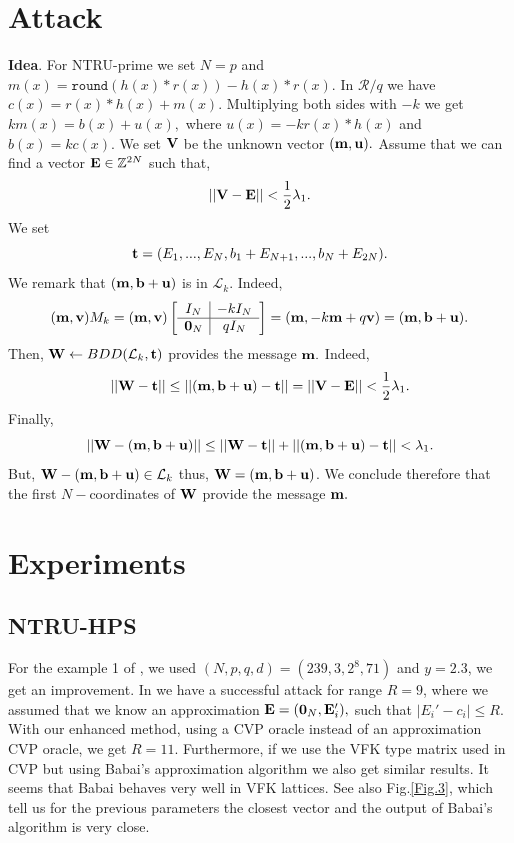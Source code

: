 \documentclass{amsart}
\numberwithin{equation}{section}
\begin{document}
{\section{Attack}
{\bf Idea}. For NTRU-prime we set $N=p$ and $m(x)=\texttt{round}(h(x)*r(x)) - h(x)*r(x).$ In ${\mathcal{R}}/q$ we have $c(x)=r(x)*h(x)+m(x).$ Multiplying both sides with $-k$ we get 
$km(x)=b(x)+u(x),$
where $u(x)=-kr(x)*h(x)$ and $b(x)=kc(x).$
We set ${\bf V}$ be the unknown vector $({\bf m},{\bf u}).$ Assume that we can find a vector ${\bf E}\in {\mathbb{Z}}^{2N}$ such that,
$$||{\bf V}-{\bf E}||<\frac{1}{2}\lambda_1.$$
We set 
$${\bf t}=(E_1,...,E_N,b_1+E_{N+1},...,b_N+E_{2N}).$$
We remark that 
$({\bf m},{\bf b}+{\bf u})$ is in ${\mathcal{L}}_k.$ 
Indeed,
$$({\bf m},{\bf v})M_k=
({\bf m},{\bf v})\left[\begin{array}{c|c}
			I_N & -kI_N  \\
			\hline
			{\bf 0}_N & qI_N   \\
		\end{array}\right] = 	 ({\bf m},-k{\bf m}+q{\bf v})=({\bf m},{\bf b}+{\bf u}).$$
Then, ${\bf W}\leftarrow BDD({\mathcal{L}}_k,{\bf t})$  provides the message ${\bf m}.$ Indeed,
$$||{\bf W} - {\bf t}||\le ||({\bf m},{\bf b}+{\bf u})-{\bf t}||=||{\bf V}-{\bf E}||<\frac{1}{2}\lambda_1.$$
Finally, 
$$||{\bf W}-({\bf m},{\bf b}+{\bf u})||\le ||{\bf W}-{\bf t}|| +  ||({\bf m},{\bf b}+{\bf u}) - {\bf t}||<\lambda_1.$$
But, ${\bf W}-({\bf m},{\bf b}+{\bf u})\in {\mathcal{L}}_k$ thus, ${\bf W}=({\bf m},{\bf b}+{\bf u})$. We conclude therefore that the first $N-$coordinates of ${\bf W}$ provide the message ${\bf m}.$
\section{Experiments}
\subsection{NTRU-HPS}
For the example 1 of \cite{adam_draz}, we used $(N,p,q,d)=(239,3,2^{8},71)$ and $y=2.3$, we get an improvement. In \cite{adam_draz} we have a successful attack for range $R=9$, where we assumed that we know an approximation 
${\bf E}=({\bf 0}_N,{\bf E}_i'),$ such that $|E_i'-c_i|\leq R.$ With our enhanced method, using a CVP oracle instead of an approximation CVP oracle, we get $R=11.$ Furthermore, if we use the VFK type matrix used in CVP but using Babai's approximation algorithm we also get similar results. It seems that Babai behaves very well in VFK lattices. See also Fig.\ref{Fig.3}, which tell us for the previous parameters the closest vector and the output of Babai's algorithm is very close.

}
\end{document}
